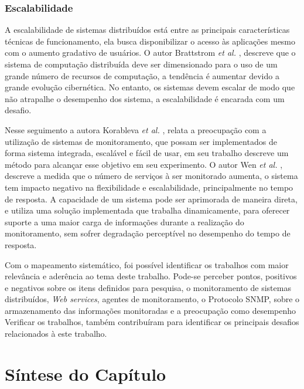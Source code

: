 \subsubsection{Escalabilidade}

A escalabilidade de sistemas distribuídos está entre as principais características técnicas de funcionamento, ela busca disponibilizar o acesso às aplicações mesmo com o aumento gradativo de usuários. O autor Brattstrom \textit{et al.} \cite{Brattstrom_7987194}, descreve que o sistema de computação distribuída deve ser dimensionado para o uso de um grande número de recursos de computação, a tendência é aumentar devido a grande evolução cibernética. No entanto, os sistemas devem escalar de modo que não atrapalhe o desempenho dos sistema, a escalabilidade é encarada com um desafio. 

Nesse seguimento a autora Korableva \textit{et al.} \cite{korableva2017building}, relata a preocupação com a utilização de sistemas de monitoramento, que possam ser implementados de forma sistema integrada, escalável e fácil de usar, em seu trabalho descreve um método para alcançar esse objetivo em seu experimento. O autor Wen \textit{et al.} \cite{Junhao}, descreve a medida que o número de serviços à ser monitorado aumenta, o sistema tem impacto negativo na flexibilidade e escalabilidade, principalmente no tempo de resposta. A capacidade de um sistema pode ser aprimorada de maneira direta, e utiliza uma solução implementada que trabalha dinamicamente, para oferecer suporte a uma maior carga de informações durante a realização do monitoramento, sem sofrer degradação perceptível no desempenho do tempo de resposta. 

\vspace{10mm}
\noindent

Com o mapeamento sistemático, foi possível identificar os trabalhos com maior relevância e aderência ao tema deste trabalho. Pode-se perceber pontos, positivos e negativos sobre os itens definidos para pesquisa, o monitoramento de sistemas distribuídos, \textit{Web services}, agentes de monitoramento, o  Protocolo \acrshort{SNMP}, sobre o armazenamento das informações monitoradas e a preocupação como desempenho Verificar os trabalhos, também contribuíram para identificar os principais desafios relacionados à este trabalho.


\section{Síntese do Capítulo}

